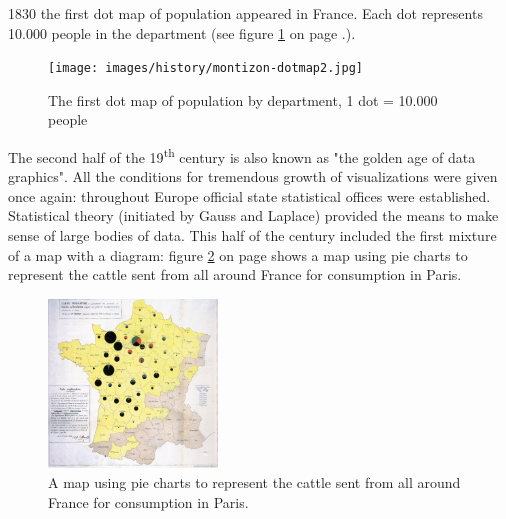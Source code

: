 1830 the first dot map of population appeared in France. Each dot represents 10.000 people in the department (see figure \ref{fig:first-dotmap} on page \pageref{fig:first-dotmap}.).

\begin{figure}[!htb]
\centering
\texttt{[image: images/history/montizon-dotmap2.jpg]}
\caption[
    The first dot map of population by department, 1 dot = 10.000 people, Urldate: 07.2016 \newline
\small\texttt{\url{http://gallica.bnf.fr/ark:/12148/btv1b8492261j/f1.highres}}
]{The first dot map of population by department, 1 dot = 10.000 people}
\label{fig:first-dotmap}
\end{figure}

The second half of the 19\textsuperscript{th} century is also known as "the golden age of data graphics". All the conditions for tremendous growth of visualizations were given once again: throughout Europe official state statistical offices were established.
Statistical theory (initiated by Gauss and Laplace) provided the means to make sense of large bodies of data.
This half of the century included the first mixture of a map with a diagram: figure \ref{fig:first-mixture} on page \pageref{fig:first-mixture} shows a map using pie charts to represent the cattle sent from all around France for consumption in Paris.

\begin{figure}[!htb]
\centering
\includegraphics[width=0.4\textwidth,keepaspectratio]{images/history/minard.png}
\caption[
    A map using pie charts to represent the cattle sent from all around France for consumption in Paris., Urldate: 07.2016 \newline
\small\texttt{\url{https://upload.wikimedia.org/wikipedia/commons/1/1c/Minard-carte-viande-1858.png}}
]{A map using pie charts to represent the cattle sent from all around France for consumption in Paris.}
\label{fig:first-mixture}
\end{figure}

